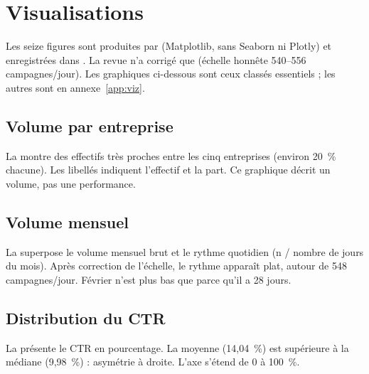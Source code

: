 \chapter{Visualisations}
\label{chap:visualisations}

Les seize figures sont produites par  (Matplotlib, sans Seaborn ni Plotly) et enregistrées dans . La revue n'a corrigé que  (échelle honnête 540--556 campagnes/jour). Les graphiques ci-dessous sont ceux classés essentiels ; les autres sont en annexe~\ref{app:viz}.

\section{Volume par entreprise}

La  montre des effectifs très proches entre les cinq entreprises (environ 20~\% chacune). Les libellés indiquent l'effectif et la part. Ce graphique décrit un volume, pas une performance.


\section{Volume mensuel}

La  superpose le volume mensuel brut et le rythme quotidien (n / nombre de jours du mois). Après correction de l'échelle, le rythme apparaît plat, autour de 548 campagnes/jour. Février n'est plus bas que parce qu'il a 28 jours.


\section{Distribution du CTR}

La  présente le CTR en pourcentage. La moyenne (14,04~\%) est supérieure à la médiane (9,98~\%) : asymétrie à droite. L'axe s'étend de 0 à 100~\%.


